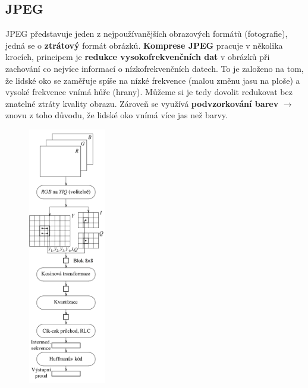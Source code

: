 \subsection{JPEG}
JPEG představuje jeden z nejpoužívanějších obrazových formátů (fotografie), jedná se o \textbf{ztrátový} formát obrázků. \textbf{Komprese JPEG} pracuje v několika krocích, principem je \textbf{redukce vysokofrekvenčních dat} v obrázků při zachování co nejvíce informací o nízkofrekvenčních datech. To je založeno na tom, že lidské oko se zaměřuje spíše na nízké frekvence (malou změnu jasu na ploše) a vysoké frekvence vnímá hůře (hrany). Můžeme si je tedy dovolit redukovat bez znatelné ztráty kvality obrazu. Zároveň se využívá \textbf{podvzorkování barev} $\rightarrow$ znovu z toho důvodu, že lidské oko vnímá více jas než barvy.

\begin{figure}[H]
	\centering
	\includegraphics[width=0.3\textwidth]{assets/7_jpeg}
\end{figure}

